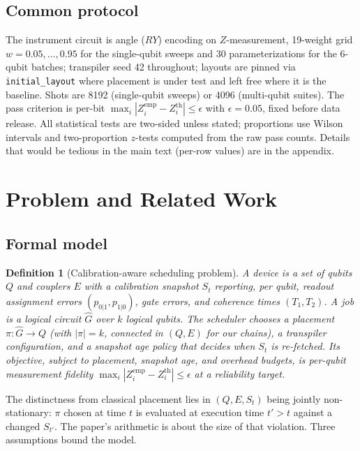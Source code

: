 \documentclass[journal,10pt,twocolumn]{IEEEtran}
\newtheorem{definition}{Definition}
\begin{document}
\subsection{Common protocol}
The instrument circuit is angle ($RY$) encoding on $Z$-measurement, 19-weight grid $w{=}0.05,\dots,0.95$ for the
single-qubit sweeps and 30 parameterizations for the 6-qubit batches; transpiler seed 42 throughout; layouts are
pinned via \texttt{initial\_layout} where placement is under test and left free where it is the baseline. Shots are
8192 (single-qubit sweeps) or 4096 (multi-qubit suites). The pass criterion is per-bit
$\max_i|Z_i^{\mathrm{emp}}-Z_i^{\mathrm{th}}|\le\epsilon$ with $\epsilon{=}0.05$, fixed before data release. All
statistical tests are two-sided unless stated; proportions use Wilson intervals and two-proportion $z$-tests computed
from the raw pass counts. Details that would be tedious in the main text (per-row values) are in the appendix.

\section{Problem and Related Work}
\label{sec:related}
\subsection{Formal model}
\begin{definition}[Calibration-aware scheduling problem]
A device is a set of qubits $Q$ and couplers $E$ with a calibration snapshot $S_t$ reporting, per qubit, readout
assignment errors $(p_{0|1},p_{1|0})$, gate errors, and coherence times $(T_1,T_2)$. A job is a logical circuit
$\hat{G}$ over $k$ logical qubits. The scheduler chooses a \emph{placement} $\pi:\hat{G}\to Q$ (with
$|\pi|=k$, connected in $(Q,E)$ for our chains), a transpiler configuration, and a \emph{snapshot age policy}
that decides when $S_t$ is re-fetched. Its objective, subject to placement, snapshot age, and overhead budgets, is
per-qubit measurement fidelity $\max_i|Z_i^{\mathrm{emp}}\!\!-\!Z_i^{\mathrm{th}}|\!\le\!\epsilon$ at a
reliability target.
\end{definition}
The distinctness from classical placement lies in $(Q,E,S_t)$ being jointly non-stationary: $\pi$ chosen at time $t$
is evaluated at execution time $t'>t$ against a changed $S_{t'}$. The paper's arithmetic is about the size of that
violation. Three assumptions bound the model.
\end{document}
